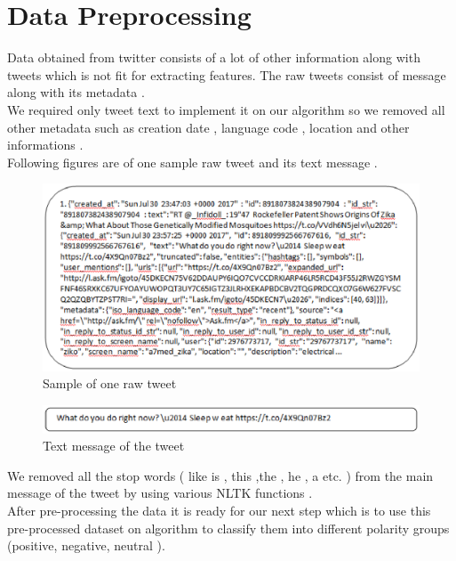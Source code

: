 \section{Data Preprocessing}
    Data obtained from twitter consists of a lot of other information along with tweets which is not fit for extracting features. The raw tweets consist of message along with its metadata .\\
     We required only  tweet text to implement it on our algorithm so we removed all  other metadata such as creation date , language code , location and other informations .\\
    Following figures are of  one sample raw tweet and its text message .
 \begin{figure}[h]
\centerline{\includegraphics[width=5.7in]{ort}}
\caption{Sample of one raw tweet}
\end{figure}
  \begin{figure}[h]
\centerline{\includegraphics[width=5.7in]{oct}}
\caption{Text message of the tweet}
\end{figure}
We removed all the stop words ( like is , this ,the , he , a etc. ) from the  main message of the tweet  by using various NLTK functions .\\
After pre-processing the data it is ready for our next step which is to use this pre-processed dataset  on algorithm  to classify them into different polarity groups (positive, negative, neutral ).
